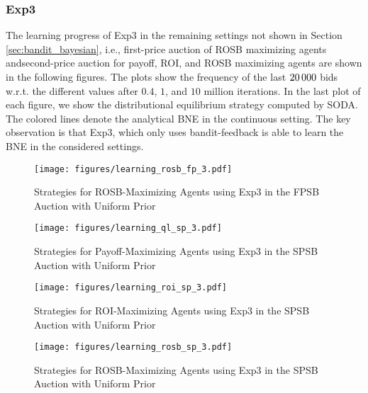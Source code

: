 \documentclass{article}
\begin{document}
\begin{appendix}
\subsubsection{Exp3} \label{app:bandit_bayesian}
The learning progress of Exp3 in the remaining settings not shown in Section \ref{sec:bandit_bayesian}, i.e., first-price auction of ROSB maximizing agents andsecond-price auction for payoff, ROI, and ROSB maximizing agents are shown in the following figures. 
The plots show the frequency of the last $20\thinspace000$ bids w.r.t. the different values after $0.4$, $1$, and $10$ million iterations.   
In the last plot of each figure, we show the distributional equilibrium strategy computed by SODA. The colored lines denote the analytical BNE in the continuous setting. The key observation is that Exp3, which only uses bandit-feedback is able to learn the BNE in the considered settings.
\begin{figure}[h]
	\begin{center}
	\texttt{[image: figures/learning\_rosb\_fp\_3.pdf]}
	\caption{Strategies for ROSB-Maximizing Agents using Exp3 in the FPSB Auction with Uniform Prior}
	\end{center} 
	\label{fig:exp3_rosb_fp}
\end{figure}

\begin{figure}[h]
	\begin{center}
		\texttt{[image: figures/learning\_ql\_sp\_3.pdf]}
		\caption{Strategies for Payoff-Maximizing Agents using Exp3 in the SPSB Auction with Uniform Prior}
	\end{center} 
	\label{fig:exp3_ql_sp}
\end{figure}
\clearpage
\begin{figure}[t]
	\begin{center}
		\texttt{[image: figures/learning\_roi\_sp\_3.pdf]}
		\caption{Strategies for ROI-Maximizing Agents using Exp3 in the SPSB Auction with Uniform Prior}
	\end{center} 
	\label{fig:exp3_roi_sp}
\end{figure}

\begin{figure}[t]
	\begin{center}
		\texttt{[image: figures/learning\_rosb\_sp\_3.pdf]}
		\caption{Strategies for ROSB-Maximizing Agents using Exp3 in the SPSB Auction with Uniform Prior}
	\end{center} 
	\label{fig:exp3_rosb_sp}
\end{figure}
\vspace*{\fill}
\end{appendix}
\end{document}
